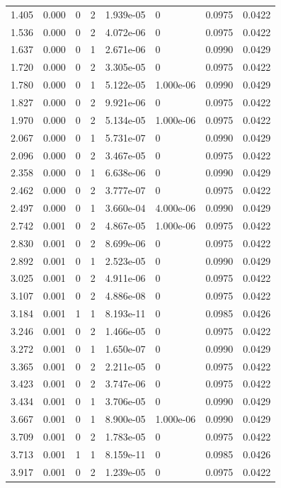 \documentclass[preview]{standalone}
\begin{document}
{{\begin{tabular}{L{1.2cm}C{1.2cm} C{0.3cm}C{0.5cm} C{1.4cm}C{1.4cm} C{1.4cm}C{1.4cm}}
  1.405  &  0.000  & 0     &  2 &  1.939e-05  & 0  & 0.0975 &  0.0422   \\ 
  1.536  &  0.000  & 0     &  2 &  4.072e-06  & 0  & 0.0975 &  0.0422   \\ 
  1.637  &  0.000  & 0     &  1 &  2.671e-06  & 0  & 0.0990 &  0.0429   \\ 
  1.720  &  0.000  & 0     &  2 &  3.305e-05  & 0  & 0.0975 &  0.0422   \\ 
  1.780  &  0.000  & 0     &  1 &  5.122e-05  & 1.000e-06  & 0.0990 &  0.0429   \\ 
  1.827  &  0.000  & 0     &  2 &  9.921e-06  & 0  & 0.0975 &  0.0422   \\ 
  1.970  &  0.000  & 0     &  2 &  5.134e-05  & 1.000e-06  & 0.0975 &  0.0422   \\ 
  2.067  &  0.000  & 0     &  1 &  5.731e-07  & 0  & 0.0990 &  0.0429   \\ 
  2.096  &  0.000  & 0     &  2 &  3.467e-05  & 0  & 0.0975 &  0.0422   \\ 
  2.358  &  0.000  & 0     &  1 &  6.638e-06  & 0  & 0.0990 &  0.0429   \\ 
  2.462  &  0.000  & 0     &  2 &  3.777e-07  & 0  & 0.0975 &  0.0422   \\ 
  2.497  &  0.000  & 0     &  1 &  3.660e-04  & 4.000e-06  & 0.0990 &  0.0429   \\ 
  2.742  &  0.001  & 0     &  2 &  4.867e-05  & 1.000e-06  & 0.0975 &  0.0422   \\ 
  2.830  &  0.001  & 0     &  2 &  8.699e-06  & 0  & 0.0975 &  0.0422   \\ 
  2.892  &  0.001  & 0     &  1 &  2.523e-05  & 0  & 0.0990 &  0.0429   \\ 
  3.025  &  0.001  & 0     &  2 &  4.911e-06  & 0  & 0.0975 &  0.0422   \\ 
  3.107  &  0.001  & 0     &  2 &  4.886e-08  & 0  & 0.0975 &  0.0422   \\ 
  3.184  &  0.001  & 1     &  1 &  8.193e-11  & 0  & 0.0985 &  0.0426   \\ 
  3.246  &  0.001  & 0     &  2 &  1.466e-05  & 0  & 0.0975 &  0.0422   \\ 
  3.272  &  0.001  & 0     &  1 &  1.650e-07  & 0  & 0.0990 &  0.0429   \\ 
  3.365  &  0.001  & 0     &  2 &  2.211e-05  & 0  & 0.0975 &  0.0422   \\ 
  3.423  &  0.001  & 0     &  2 &  3.747e-06  & 0  & 0.0975 &  0.0422   \\ 
  3.434  &  0.001  & 0     &  1 &  3.706e-05  & 0  & 0.0990 &  0.0429   \\ 
  3.667  &  0.001  & 0     &  1 &  8.900e-05  & 1.000e-06  & 0.0990 &  0.0429   \\ 
  3.709  &  0.001  & 0     &  2 &  1.783e-05  & 0  & 0.0975 &  0.0422   \\ 
  3.713  &  0.001  & 1     &  1 &  8.159e-11  & 0  & 0.0985 &  0.0426   \\ 
  3.917  &  0.001  & 0     &  2 &  1.239e-05  & 0  & 0.0975 &  0.0422   \\ 
\hline 
\end{tabular} 

}}
\end{document}
